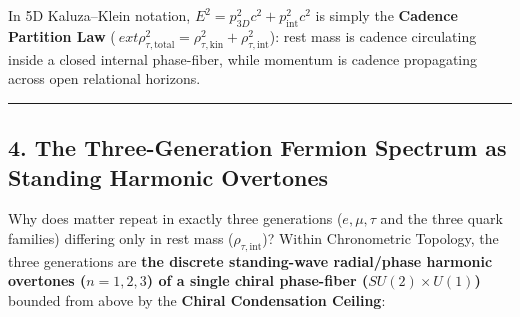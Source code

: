 \documentclass[
]{article}
\begin{document}
In 5D Kaluza--Klein notation,
\(E^2 = p_{3D}^2 c^2 + p_{\text{int}}^2 c^2\) is simply the
\textbf{Cadence Partition Law}
(\(\    ext{\rho}_{\tau,\text{total}}^2 = \rho_{\tau,\text{kin}}^2 + \rho_{\tau,\text{int}}^2\)):
rest mass is cadence circulating inside a closed internal phase-fiber,
while momentum is cadence propagating across open relational horizons.

\begin{center}\rule{0.5\linewidth}{0.5pt}\end{center}

\subsection{4. The Three-Generation Fermion Spectrum as Standing
Harmonic
Overtones}\label{the-three-generation-fermion-spectrum-as-standing-harmonic-overtones}

Why does matter repeat in exactly three generations (\(e, \mu, \tau\)
and the three quark families) differing only in rest mass
(\(\rho_{\tau,\text{int}}\))? Within Chronometric Topology, the three
generations are \textbf{the discrete standing-wave radial/phase harmonic
overtones (\(n = 1, 2, 3\)) of a single chiral phase-fiber
(\(SU(2) \times U(1)\))} bounded from above by the \textbf{Chiral
Condensation Ceiling}:
\end{document}
